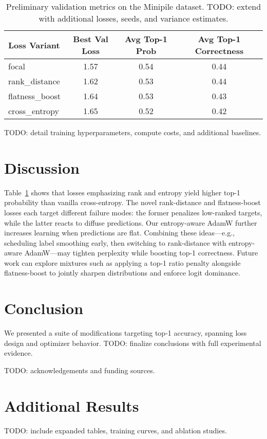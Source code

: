 \documentclass{article}
\begin{document}
\begin{table}[ht]
    \centering
    \begin{tabular}{lccc}
        \toprule
        Loss Variant & Best Val Loss & Avg Top-1 Prob & Avg Top-1 Correctness \\
        \midrule
        focal & 1.57 & 0.54 & 0.44 \\
        rank\_distance & 1.62 & 0.53 & 0.44 \\
        flatness\_boost & 1.64 & 0.53 & 0.43 \\
        cross\_entropy & 1.65 & 0.52 & 0.42 \\
        \bottomrule
    \end{tabular}
    \caption{Preliminary validation metrics on the Minipile dataset. TODO: extend with additional losses, seeds, and variance estimates.}
    \label{tab:results}
\end{table}

TODO: detail training hyperparameters, compute costs, and additional baselines.

\section{Discussion}
Table~\ref{tab:results} shows that losses emphasizing rank and entropy yield higher top-1 probability than vanilla cross-entropy. The novel rank-distance and flatness-boost losses each target different failure modes: the former penalizes low-ranked targets, while the latter reacts to diffuse predictions. Our entropy-aware AdamW further increases learning when predictions are flat. Combining these ideas---e.g., scheduling label smoothing early, then switching to rank-distance with entropy-aware AdamW---may tighten perplexity while boosting top-1 correctness. Future work can explore mixtures such as applying a top-1 ratio penalty alongside flatness-boost to jointly sharpen distributions and enforce logit dominance.

\section{Conclusion}
We presented a suite of modifications targeting top-1 accuracy, spanning loss design and optimizer behavior. TODO: finalize conclusions with full experimental evidence.

\begin{ack}
TODO: acknowledgements and funding sources.
\end{ack}




\appendix
\section{Additional Results}
TODO: include expanded tables, training curves, and ablation studies.
\end{document}
